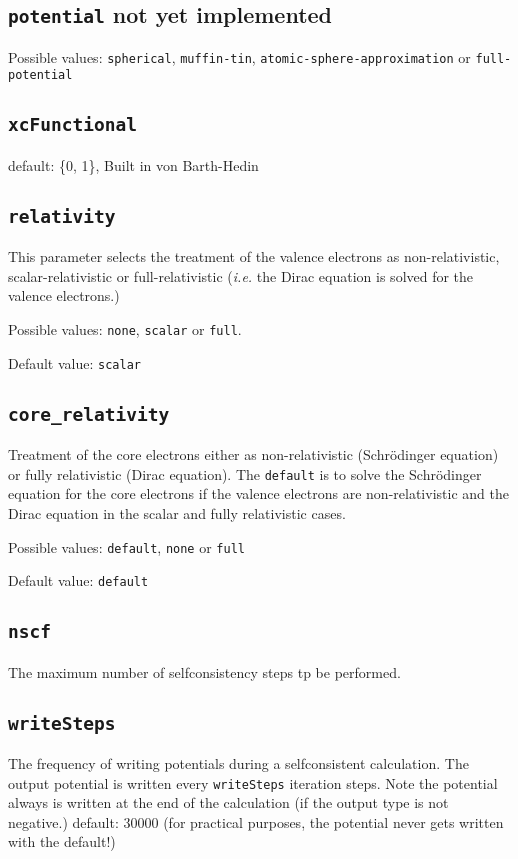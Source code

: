 \subsection{\texttt{potential} not yet implemented}
Possible values: \texttt{spherical}, \texttt{muffin-tin},
\texttt{atomic-sphere-approximation} or \texttt{full-potential}

\subsection{\texttt{xcFunctional}}
default: \{0, 1\}, Built in von Barth-Hedin

\subsection{\texttt{relativity}}
This parameter selects the treatment of the valence electrons as non-relativistic, scalar-relativistic
or full-relativistic (\textit{i.e.} the Dirac equation is solved for the valence electrons.)

Possible values: \texttt{none}, \texttt{scalar} or \texttt{full}.

Default value: \texttt{scalar} 

\subsection{\texttt{core\_relativity}}
Treatment of the core electrons either as non-relativistic (Schr\"odinger equation)
or fully relativistic (Dirac equation).
The \texttt{default} is to solve the Schr\"odinger equation for the core electrons if the valence
electrons are non-relativistic and the Dirac equation in the scalar and fully relativistic cases.
 
Possible values: \texttt{default}, \texttt{none} or \texttt{full}

Default value: \texttt{default}

\subsection{\texttt{nscf}}
The maximum number of selfconsistency steps tp be performed.

\subsection{\texttt{writeSteps}}
The frequency of writing potentials during a selfconsistent
calculation. The output potential is written every \texttt{writeSteps}
iteration steps. Note the potential always is written at the end of
the calculation (if the output type is not negative.)
default: 30000 (for practical purposes, the potential never gets
written with the default!)

